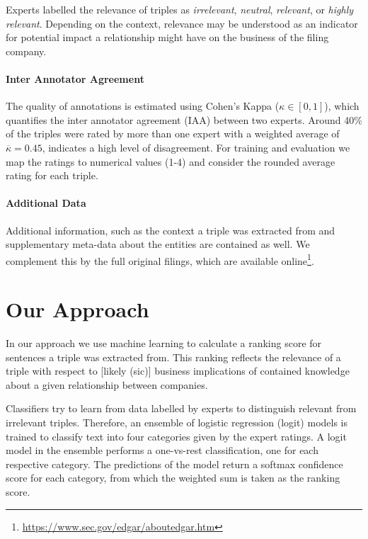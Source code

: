 Experts labelled the relevance of triples as \textit{irrelevant}, \textit{neutral}, \textit{relevant}, or \textit{highly relevant}.
Depending on the context, relevance may be understood as an indicator for potential impact a relationship might have on the business of the filing company. 

{\setlength{\parindent}{0cm}
\paragraph{\textbf{Inter Annotator Agreement}}
The quality of annotations is estimated using Cohen's Kappa ($\kappa\in [0,1]$), which quantifies the inter annotator agreement (IAA) between two experts\cite{ir}.
Around 40\% of the triples were rated by more than one expert with a weighted average of $\overline{\kappa}=0.45$, indicates a high level of disagreement.
For training and evaluation we map the ratings to numerical values (1-4) and consider the rounded average rating for each triple.
}

{\setlength{\parindent}{0cm}
\paragraph{\textbf{Additional Data}}
Additional information, such as the context a triple was extracted from and supplementary meta-data about the entities are contained as well.
We complement this by the full original filings, which are available online\footnote{\url{https://www.sec.gov/edgar/aboutedgar.htm}}.
}

\section{Our Approach}
In our approach we use machine learning to calculate a ranking score for sentences a triple was extracted from.
This ranking reflects the relevance of a triple with respect to [likely (sic)] business implications of contained knowledge about a given relationship between companies.

Classifiers try to learn from data labelled by experts to distinguish relevant from irrelevant triples.
Therefore, an ensemble of logistic regression (logit) models is trained to classify text into four categories given by the expert ratings.
A logit model in the ensemble performs a one-vs-rest classification, one for each respective category.
The predictions of the model return a softmax confidence score for each category, from which the weighted sum is taken as the ranking score.

